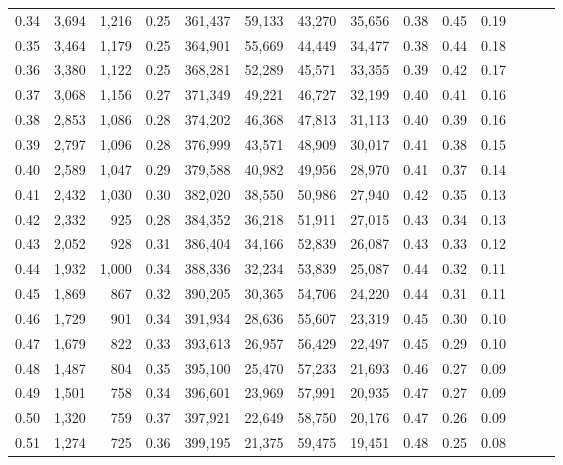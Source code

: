 \begin{tabular}{rrrrrrrrrrrrrr}
0.34 &   3,694 &  1,216 &  0.25 &  361,437 &   59,133 &  43,270 &  35,656 &  0.38 &  0.45 &      0.19 \\
0.35 &   3,464 &  1,179 &  0.25 &  364,901 &   55,669 &  44,449 &  34,477 &  0.38 &  0.44 &      0.18 \\
0.36 &   3,380 &  1,122 &  0.25 &  368,281 &   52,289 &  45,571 &  33,355 &  0.39 &  0.42 &      0.17 \\
0.37 &   3,068 &  1,156 &  0.27 &  371,349 &   49,221 &  46,727 &  32,199 &  0.40 &  0.41 &      0.16 \\
0.38 &   2,853 &  1,086 &  0.28 &  374,202 &   46,368 &  47,813 &  31,113 &  0.40 &  0.39 &      0.16 \\
0.39 &   2,797 &  1,096 &  0.28 &  376,999 &   43,571 &  48,909 &  30,017 &  0.41 &  0.38 &      0.15 \\
0.40 &   2,589 &  1,047 &  0.29 &  379,588 &   40,982 &  49,956 &  28,970 &  0.41 &  0.37 &      0.14 \\
0.41 &   2,432 &  1,030 &  0.30 &  382,020 &   38,550 &  50,986 &  27,940 &  0.42 &  0.35 &      0.13 \\
0.42 &   2,332 &    925 &  0.28 &  384,352 &   36,218 &  51,911 &  27,015 &  0.43 &  0.34 &      0.13 \\
0.43 &   2,052 &    928 &  0.31 &  386,404 &   34,166 &  52,839 &  26,087 &  0.43 &  0.33 &      0.12 \\
0.44 &   1,932 &  1,000 &  0.34 &  388,336 &   32,234 &  53,839 &  25,087 &  0.44 &  0.32 &      0.11 \\
0.45 &   1,869 &    867 &  0.32 &  390,205 &   30,365 &  54,706 &  24,220 &  0.44 &  0.31 &      0.11 \\
0.46 &   1,729 &    901 &  0.34 &  391,934 &   28,636 &  55,607 &  23,319 &  0.45 &  0.30 &      0.10 \\
0.47 &   1,679 &    822 &  0.33 &  393,613 &   26,957 &  56,429 &  22,497 &  0.45 &  0.29 &      0.10 \\
0.48 &   1,487 &    804 &  0.35 &  395,100 &   25,470 &  57,233 &  21,693 &  0.46 &  0.27 &      0.09 \\
0.49 &   1,501 &    758 &  0.34 &  396,601 &   23,969 &  57,991 &  20,935 &  0.47 &  0.27 &      0.09 \\
0.50 &   1,320 &    759 &  0.37 &  397,921 &   22,649 &  58,750 &  20,176 &  0.47 &  0.26 &      0.09 \\
0.51 &   1,274 &    725 &  0.36 &  399,195 &   21,375 &  59,475 &  19,451 &  0.48 &  0.25 &      0.08 \\

\end{tabular}
